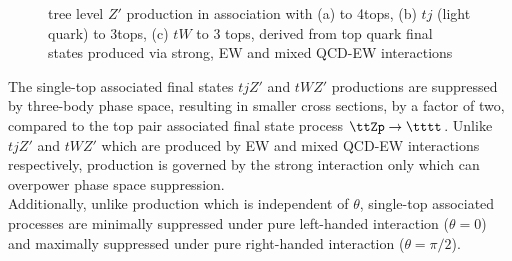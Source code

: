 \documentclass[../thesis.tex]{subfiles}
\begin{document}
\begin{figure}[!htbp]
\centering
{}
\caption[Caption]{\label{fig:theory:ttZp_feynman}tree level $Z'$ production in association with (a) \ttbar to 4tops, (b) $tj$ (light quark) to 3tops, (c) $tW$ to 3 tops, derived from top quark final states produced via strong, \acs{EW} and mixed \acs{QCD}-\acs{EW} interactions \citep{theory:ttZp}}
\end{figure}

The single-top associated final states $tjZ'$ and $tWZ'$ productions are suppressed by three-body phase space, resulting in smaller cross sections, by a factor of two, compared to the top pair associated final state process $\ttZp\rightarrow\tttt$. Unlike $tjZ'$ and $tWZ'$ which are produced by \acs{EW} and mixed \acs{QCD}-\acs{EW} interactions respectively, \tttt production is governed by the strong interaction only which can overpower phase space suppression.\\
Additionally, unlike \tttt production which is independent of $\theta$, single-top associated processes are minimally suppressed under pure left-handed interaction ($\theta=0$) and maximally suppressed under pure right-handed interaction ($\theta=\pi/2$).
\end{document}
